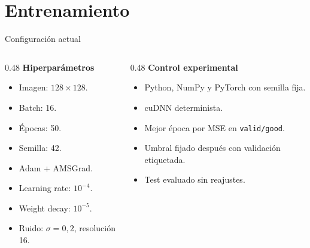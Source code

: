 \documentclass[10pt,aspectratio=169]{beamer}
\begin{document}
\section{Entrenamiento}

\begin{frame}{Configuración actual}
  \begin{columns}[T]
    \begin{column}{0.48\textwidth}
      \textbf{Hiperparámetros}
      \begin{itemize}
        \item Imagen: $128\times128$.
        \item Batch: 16.
        \item Épocas: 50.
        \item Semilla: 42.
        \item Adam + AMSGrad.
        \item Learning rate: $10^{-4}$.
        \item Weight decay: $10^{-5}$.
        \item Ruido: $\sigma=0{,}2$, resolución 16.
      \end{itemize}
    \end{column}
    \begin{column}{0.48\textwidth}
      \textbf{Control experimental}
      \begin{itemize}
        \item Python, NumPy y PyTorch con semilla fija.
        \item cuDNN determinista.
        \item Mejor época por MSE en \texttt{valid/good}.
        \item Umbral fijado después con validación etiquetada.
        \item Test evaluado sin reajustes.
      \end{itemize}
    \end{column}
  \end{columns}
\end{frame}
\end{document}
